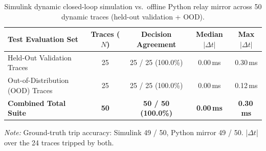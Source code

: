 \begin{table}[H]\centering
\caption{Simulink dynamic closed-loop simulation vs.\ offline Python relay mirror across 50 dynamic traces (held-out validation + OOD).}\label{tab:6.5_closed_loop}
\small
\begin{tabular}{@{}lcccc@{}}\toprule
\textbf{Test Evaluation Set} & \textbf{Traces ($N$)} & \textbf{Decision Agreement} & \textbf{Median $|\Delta t|$} & \textbf{Max $|\Delta t|$}\\ \midrule
Held-Out Validation Traces & 25 & 25 / 25 (100.0\%) & 0.00\,ms & 0.30\,ms\\
Out-of-Distribution (OOD) Traces & 25 & 25 / 25 (100.0\%) & 0.00\,ms & 0.12\,ms\\ \midrule
\textbf{Combined Total Suite} & \textbf{50} & \textbf{50 / 50 (100.0\%)} & \textbf{0.00\,ms} & \textbf{0.30\,ms}\\
\bottomrule
\end{tabular}
\vspace{3pt}\raggedright\footnotesize\textit{Note:} Ground-truth trip accuracy: Simulink 49 / 50, Python mirror 49 / 50. |$\Delta t$| over the 24 traces tripped by both.
\end{table}